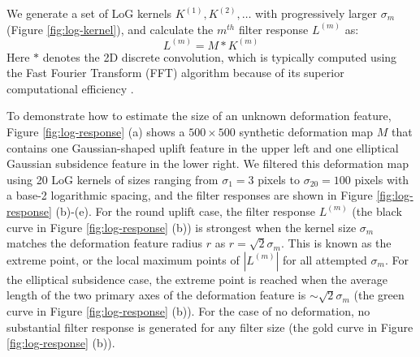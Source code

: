 \documentclass{utexasthesis}
\begin{document}

We generate a set of LoG kernels $K^{(1)}, K^{(2)}, \ldots$ with progressively larger $\sigma_m$ (Figure \ref{fig:log-kernel}), and calculate the $m^{th}$ filter response $ L^{(m)} $ as:
\begin{equation}
L^{(m)} = M \ast K^{(m)}  \label{eq:log-layer-conv}
\end{equation}
Here $*$ denotes the 2D discrete convolution, which is typically computed using the Fast Fourier Transform (FFT) algorithm because of its superior computational efficiency \citep{Szeliski2022ComputerVision}.

To demonstrate how to estimate the size of an unknown deformation feature, Figure \ref{fig:log-response} (a) shows a $500 \times 500$ synthetic deformation map $M$ that contains one Gaussian-shaped uplift feature in the upper left and one elliptical Gaussian subsidence feature in the lower right. We filtered this deformation map using 20 LoG kernels of sizes ranging from $\sigma_1 = 3$ pixels to $\sigma_{20} = 100$ pixels with a base-2 logarithmic spacing, and the filter responses are shown in Figure \ref{fig:log-response} (b)-(e). For the round uplift case, the filter response $L^{(m)}$ (the black curve in Figure \ref{fig:log-response} (b)) is strongest when the kernel size $\sigma_m$ matches the deformation feature radius $r$ as $r = \sqrt{2}\sigma_m$. This is known as the extreme point, or the local maximum points of $|L^{(m)}|$ for all attempted $\sigma_m$. For the elliptical subsidence case, the extreme point is reached when the average length of the two primary axes of the deformation feature is $\sim \sqrt{2}\sigma_m$ (the green curve in Figure \ref{fig:log-response} (b)). For the case of no deformation, no substantial filter response is generated for any filter size (the gold curve in Figure \ref{fig:log-response} (b)).
	
\end{document}
